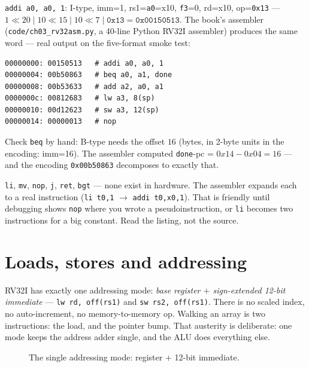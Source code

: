 \begin{example}
\label{ex:asm03}
\texttt{addi a0, a0, 1}: I-type, imm=1, rs1=\texttt{a0}=x10,
\texttt{f3}=0, rd=x10, op=\texttt{0x13} ---
$1\ll20 \mid 10\ll15 \mid 10\ll7 \mid \texttt{0x13}
= \texttt{0x00150513}$. The book's assembler
(\texttt{code/ch03\_rv32asm.py}, a 40-line Python RV32I assembler)
produces the same word --- real output on the five-format smoke test:

\begin{lstlisting}[basicstyle=\ttfamily\scriptsize]
00000000: 00150513   # addi a0, a0, 1
00000004: 00b50863   # beq a0, a1, done
00000008: 00b53633   # add a2, a0, a1
0000000c: 00812683   # lw a3, 8(sp)
00000010: 00d12623   # sw a3, 12(sp)
00000014: 00000013   # nop
\end{lstlisting}

Check \texttt{beq} by hand: B-type needs the offset $16$ (bytes, in
2-byte units in the encoding: imm=16). The assembler computed
\texttt{done}-pc = $0x14-0x04 = 16$ --- and the encoding
\texttt{0x00b50863} decomposes to exactly that.
\end{example}

\begin{tripwire}
\texttt{li}, \texttt{mv}, \texttt{nop}, \texttt{j}, \texttt{ret},
\texttt{bgt} --- none exist in hardware. The assembler expands each to
a real instruction (\texttt{li t0,1} $\to$ \texttt{addi t0,x0,1}). That
is friendly until debugging shows \texttt{nop} where you wrote a
pseudoinstruction, or \texttt{li} becomes two instructions for a big
constant. Read the listing, not the source.
\end{tripwire}

\section{Loads, stores and addressing}
\label{sec:ldst03}

RV32I has exactly one addressing mode: \emph{base register $+$
sign-extended 12-bit immediate} --- \texttt{lw rd, off(rs1)} and
\texttt{sw rs2, off(rs1)}. There is no scaled index, no auto-increment,
no memory-to-memory op. Walking an array is two instructions: the load,
and the pointer bump. That austerity is deliberate: one mode keeps the
address adder single, and the ALU does everything else.

\begin{figure}[htbp]
\centering

\caption{The single addressing mode: register $+$ 12-bit immediate.}
\label{fig:ldst03}
\end{figure}

